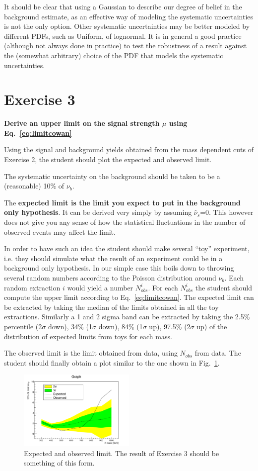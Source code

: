 \documentclass[a4paper,12pt]{article}
\begin{document}
It should be clear that using a Gaussian to describe our degree of belief in
the background estimate, as an effective way of modeling the systematic
uncertainties is not the only option. Other systematic uncertainties may be
better modeled by different PDFs, such as Uniform, of lognormal. It is in
general a good practice (although not always done in practice) to test the
robustness of a result against the (somewhat arbitrary) choice of the PDF that
models the systematic uncertainties.

\section*{Exercise 3}
{\bf Derive an upper limit on the signal strength $\mu$ using
Eq.~\ref{eq:limitcowan}}

Using the signal and background yields obtained from the mass dependent cuts
of Exercise 2, the student should plot the expected and observed limit.

The systematic uncertainty on the background should be taken to be a
(reasonable) 10\% of $\nu_b$.

The {\bf expected limit is the limit you expect to put in the background
only hypothesis}. It can be derived very simply by assuming $\hat{\nu}_s$=0.
This however does not give you any sense of how the statistical fluctuations
in the number of observed events may affect the limit. 

In order to have such an idea the student should make several
``toy'' experiment, i.e. they should simulate what the result of an
experiment  could be in a background only hypothesis. In our simple case this
boils down to throwing several random numbers according to the Poisson
distribution around $\nu_b$. Each random extraction $i$ would yield a number
$N_{obs}^i$. For each $N_{obs}^i$ the student should compute the upper limit
according to Eq.~\ref{eq:limitcowan}. The expected limit can be extracted by
taking the median of the limits obtained in all the toy extractions. Similarly
a 1 and 2 sigma band can be extracted by taking the 2.5\% percentile
(2$\sigma$ down), 34\% (1$\sigma$ down), 84\% (1$\sigma$ up), 97.5\%
(2$\sigma$ up) of the distribution of expected limits from toys for each mass. 

The observed limit is the limit obtained from data, using $N_{obs}$ from data.
The student should finally obtain a plot similar to the one shown in
Fig.~\ref{fig:limitCowan}.
\begin{figure}[!b]
\centering
\includegraphics[width=0.5\textwidth]{images/limitCowan.pdf}
\caption{Expected and observed limit. The result of Exercise 3 should be
something of this form.\label{fig:limitCowan}}
\end{figure}
\end{document}
